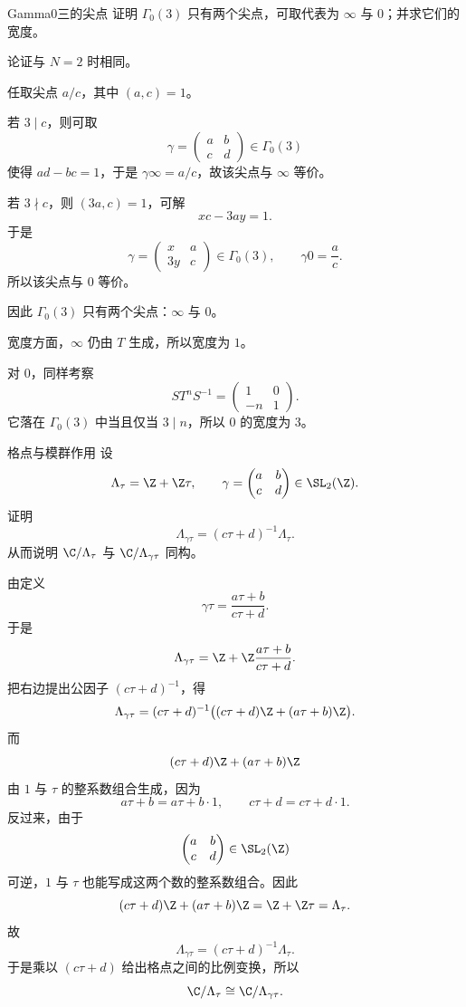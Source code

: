 \begin{problem}{Gamma0三的尖点}
\medium
证明 $\Gamma_0(3)$ 只有两个尖点，可取代表为 $\infty$ 与 $0$；并求它们的宽度。
\end{problem}
\begin{solution}
论证与 $N=2$ 时相同。

任取尖点 $a/c$，其中 $(a,c)=1$。

若 $3\mid c$，则可取
\[
\gamma=\begin{pmatrix}a&b\\c&d\end{pmatrix}\in \Gamma_0(3)
\]
使得 $ad-bc=1$，于是 $\gamma\infty=a/c$，故该尖点与 $\infty$ 等价。

若 $3\nmid c$，则 $(3a,c)=1$，可解
\[
xc-3ay=1.
\]
于是
\[
\gamma=\begin{pmatrix}x&a\\3y&c\end{pmatrix}\in\Gamma_0(3),
\qquad
\gamma 0=\frac{a}{c}.
\]
所以该尖点与 $0$ 等价。

因此 $\Gamma_0(3)$ 只有两个尖点：$\infty$ 与 $0$。

宽度方面，$\infty$ 仍由 $T$ 生成，所以宽度为 $1$。

对 $0$，同样考察
\[
ST^nS^{-1}=\begin{pmatrix}1&0\\-n&1\end{pmatrix}.
\]
它落在 $\Gamma_0(3)$ 中当且仅当 $3\mid n$，所以 $0$ 的宽度为 $3$。
\end{solution}

\begin{problem}{格点与模群作用}
\medium
设
\[
\Lambda_\tau=\Z+\Z\tau,
\qquad
\gamma=\begin{pmatrix}a&b\\c&d\end{pmatrix}\in\SL_2(\Z).
\]
证明
\[
\Lambda_{\gamma\tau}=(c\tau+d)^{-1}\Lambda_\tau.
\]
从而说明 $\C/\Lambda_\tau$ 与 $\C/\Lambda_{\gamma\tau}$ 同构。
\end{problem}
\begin{solution}
由定义
\[
\gamma\tau=\frac{a\tau+b}{c\tau+d}.
\]
于是
\[
\Lambda_{\gamma\tau}=\Z+\Z\frac{a\tau+b}{c\tau+d}.
\]
把右边提出公因子 $(c\tau+d)^{-1}$，得
\[
\Lambda_{\gamma\tau}
=(c\tau+d)^{-1}\bigl((c\tau+d)\Z+(a\tau+b)\Z\bigr).
\]
而
\[
(c\tau+d)\Z+(a\tau+b)\Z
\]
由 $1$ 与 $\tau$ 的整系数组合生成，因为
\[
a\tau+b=a\tau+b\cdot 1,
\qquad
c\tau+d=c\tau+d\cdot 1.
\]
反过来，由于
\[
\begin{pmatrix}a&b\\c&d\end{pmatrix}
\in\SL_2(\Z)
\]
可逆，$1$ 与 $\tau$ 也能写成这两个数的整系数组合。因此
\[
(c\tau+d)\Z+(a\tau+b)\Z=\Z+\Z\tau=\Lambda_\tau.
\]
故
\[
\Lambda_{\gamma\tau}=(c\tau+d)^{-1}\Lambda_\tau.
\]
于是乘以 $(c\tau+d)$ 给出格点之间的比例变换，所以
\[
\C/\Lambda_\tau\cong \C/\Lambda_{\gamma\tau}.
\]
\end{solution}

